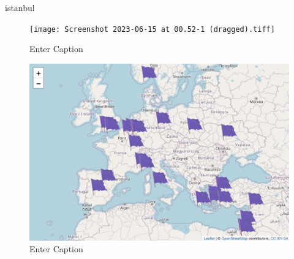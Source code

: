 \documentclass[a4paper, twoside, 12pt]{book}
\begin{document}
istanbul\\

\begin{figure}
    \centering
    \texttt{[image: Screenshot 2023-06-15 at 00.52-1 (dragged).tiff]}
    \caption{Enter Caption}
    \label{fig:enter-label}
\end{figure}

\begin{figure}
    \centering
    \includegraphics[width=0.5\linewidth]{istanbul bi birth plavces.png}
    \caption{Enter Caption}
    \label{fig:enter-label}
\end{figure}
\end{document}
